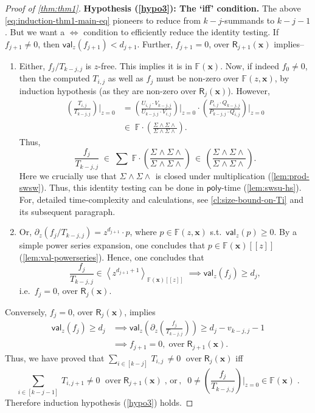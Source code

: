 \documentclass[10pt,a4paper]{article}
\newcommand{\poly}{\mathsf{poly}}
\newcommand{\F}{\mathbb{F}}
\newcommand{\ringR}{\mathsf{R}}
\newcommand{\x}{{\boldsymbol x}}
\newcommand{\val}{\mathsf{val}}
\newcommand{\SWSU}[2]{\Sigma^{#1}\!\wedge\!\Sigma\!\wedge^{#2}}
\numberwithin{equation}{section}
\begin{document}
\begin{proof}[Proof of \autoref{thm:thm1}]
\noindent \textbf{Hypothesis (\ref{hypo3}): The `iff' condition.} The above \autoref{eq:induction-thm1-main-eq} pioneers to reduce from $k-j$-summands to $k-j-1$. But we want a $\iff$ condition to efficiently reduce the identity testing. If $f_{j+1} \ne 0$, then $\val_{z}(f_{j+1}) < d_{j+1}$.  Further, $f_{j+1} = 0$, over $\ringR_{j+1}(\x)$ implies--
\begin{enumerate}
    \item Either, $f_j/T_{k-j,j}$ is $z$-free. This implies it is in $\F(\x)$. Now, if indeed $f_0 \ne 0$, then the computed $T_{i,j}$ as well as $f_j$ must be non-zero over $\F(z,\x)$, by induction hypothesis (as they are non-zero over $\ringR_j(\x)$).  However,
    \begin{align*}
    \left(\frac{T_{i,j}}{T_{k-j,j}}\right) \bigg\rvert_{z=0} &= \left( \frac{U_{i,j} \cdot V_{k-j,j}}{U_{k-j,j} \cdot V_{i,j}} \right) \bigg\rvert_{z=0} \cdot \left( \frac{P_{i,j} \cdot Q_{k-j,j}}{P_{k-j,j} \cdot Q_{i,j}} \right) \bigg\rvert_{z=0} \\ & \in\; \F \cdot \left( \frac{\SWSU{}{}{}}{\SWSU{}{}{}} \right).
    \end{align*} Thus, \[ \frac{f_j}{T_{k-j,j}} \; \in \; \sum \;  \F \cdot \left( \frac{\SWSU{}{}{}}{\SWSU{}{}{}} \right) \,\in\,  \left( \frac{\SWSU{}{}{}}{\SWSU{}{}{}} \right).\] Here we crucially use that $\SWSU{}{}{}$ is closed under multiplication (\autoref{lem:prod-swsw}). 
%
    Thus, this identity testing can be done in $\poly$-time (\autoref{lem:swsu-hs}).  For, detailed time-complexity and calculations, see \autoref{cl:size-bound-on-Ti} and its subsequent paragraph. \smallskip 
    \item Or, $\partial_{z}(f_j/T_{k-j,j}) = z^{d_{j+1}} \cdot p$, where $p \in \F(z,\x)$ s.t.~$\val_{z}(p) \ge 0$. By a simple power series expansion, one concludes that $p \in \F(\x)[[z]]$ (\autoref{lem:val-powerseries}). Hence, one concludes that \[ \frac{f_j}{T_{k-j,j}} \in  \left\langle z^{d_{j+1}+1}\right\rangle_{\F(\x)[[z]]}\; \implies \val_{z}(f_j) \ge d_j,\] i.e.~$f_j = 0$, over $\ringR_j(\x)$.
\end{enumerate}

\medskip
Conversely, $f_j=0$, over $\ringR_j(\x)$, implies \begin{align*}\val_{z}(f_j) \ge d_j &\implies \val_{z} \left( \partial_{z}\left( \frac{f_j}{T_{k-j,j}} \right) \right) \ge d_j-v_{k-j,j}-1 \\ &\implies f_{j+1}=0, \; \text{over} \; \ringR_{j+1}(\x).\end{align*}
Thus, we have proved that $\sum_{i \in [k-j]}\,T_{i,j}\,\ne 0 \;\text{ over}\;\ringR_j(\x)$ iff \[\sum_{i \in [k-j-1]}\, T_{i,j+1} \ne 0 \;\text{ over} \;\ringR_{j+1}(\x)\;,\,\text{or}\,,\;\;0 \ne \left( \frac{f_j}{T_{k-j,j}} \right)\bigg\rvert_{z=0} \in \F(\x)\;.\]
Therefore induction hypothesis (\ref{hypo3}) holds. 


\end{proof}
\end{document}
